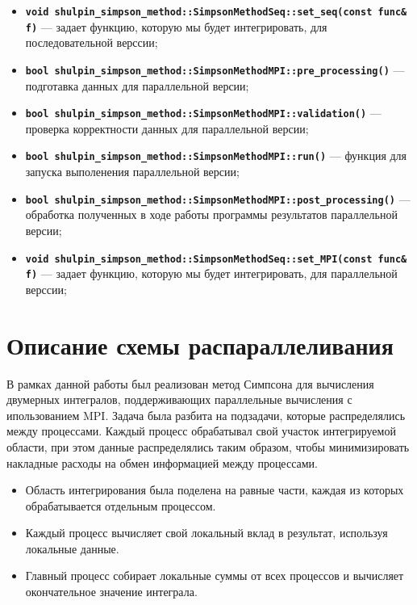 \documentclass[12pt,a4paper]{article}
\begin{document}
\begin{itemize}
    \item \textbf{\texttt{void shulpin\_simpson\_method::SimpsonMethodSeq::set\_seq(const func\& f)}} --- задает функцию, которую мы будет интегрировать, для последовательной верссии;
    \item \textbf{\texttt{bool shulpin\_simpson\_method::SimpsonMethodMPI::pre\_processing()}} --- подготавка данных для параллельной версии;
    \item \textbf{\texttt{bool shulpin\_simpson\_method::SimpsonMethodMPI::validation()}} --- проверка корректности данных для параллельной версии;
    \item \textbf{\texttt{bool shulpin\_simpson\_method::SimpsonMethodMPI::run()}} --- функция для запуска выполенения параллельной версии;
    \item \textbf{\texttt{bool shulpin\_simpson\_method::SimpsonMethodMPI::post\_processing()}} --- обработка полученных в ходе работы программы результатов параллельной версии;
    \item \textbf{\texttt{void shulpin\_simpson\_method::SimpsonMethodSeq::set\_MPI(const func\& f)}} --- задает функцию, которую мы будет интегрировать, для параллельной верссии;
\end{itemize}

\section*{Описание схемы распараллеливания}

В рамках данной работы был реализован метод Симпсона для вычисления двумерных интегралов, поддерживающих параллельные вычисления с ипользованием MPI. Задача была разбита на подзадачи, которые распределялись между процессами. Каждый процесс обрабатывал свой участок интегрируемой области, при этом данные распределялись таким образом, чтобы минимизировать накладные расходы на обмен информацией между процессами.

\begin{itemize}
    \item Область интегрирования была поделена на равные части, каждая из которых обрабатывается отдельным процессом.
    \item Каждый процесс вычисляет свой локальный вклад в результат, используя локальные данные.
    \item Главный процесс собирает локальные суммы от всех процессов и вычисляет окончательное значение интеграла.
\end{itemize}
\end{document}
